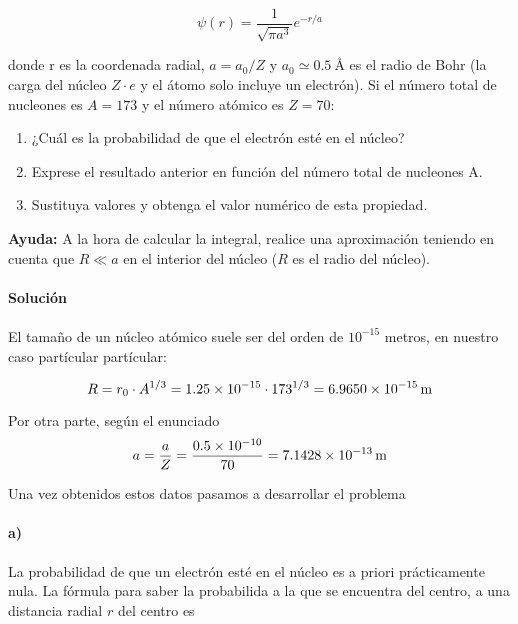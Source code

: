 \documentclass[12pt, a4paper]{article}
\begin{document}
    $$\psi(r)=\frac{1}{\sqrt{\pi a^3}}e^{-r/a}$$

    \noindent donde r es la coordenada radial, $a=a_0/Z$ y $a_0\simeq\SI{0.5}{\angstrom}$ es el radio de Bohr
    (la carga del núcleo $Z \cdot e$ y el átomo solo incluye un electrón). Si el número total de
    nucleones es $A=173$ y el número atómico es $Z=70$:

    \begin{enumerate}[label=\alph*)]
        \item ¿Cuál es la probabilidad de que el electrón esté en el núcleo?
        \item Exprese el resultado anterior en función del número total de nucleones A.
        \item Sustituya valores y obtenga el valor numérico de esta propiedad.
    \end{enumerate}
    \textbf{Ayuda:} A la hora de calcular la integral, realice una aproximación teniendo en cuenta
    que $R\ll a$ en el interior del núcleo ($R$ es el radio del núcleo).

    \paragraph{\textbf{Solución}}

    \paragraph{} El tamaño de un núcleo atómico suele ser del orden de $10^{-15}$ metros,
    en nuestro caso partícular partícular:

    \begin{equation}    \label{eq:radio_nucleo_atomico}
        R=r_0 \cdot A^{1/3} = \num{1.25d-15} \cdot 173^{1/3} = \SI{6.9650d-15}{\meter}
    \end{equation}

    Por otra parte, según el enunciado
    \begin{equation}\label{eq:calculo_de_a}
        a = \frac{a}{Z} = \frac{\num{0.5d-10}}{70} = \SI{7.1428d-13}{\meter}
    \end{equation}

    Una vez obtenidos estos datos pasamos a desarrollar el problema

    \paragraph{a)} La probabilidad de que un electrón esté en el núcleo es a priori prácticamente
    nula. La fórmula para saber la probabilida a la que se encuentra del centro, a una distancia
    radial $r$ del centro es
\end{document}
